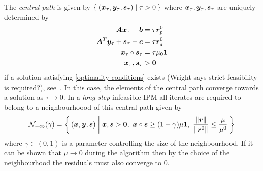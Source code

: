The \emph{central path} is given by \(\Set{(\bm{x}_\tau, \bm{y}_\tau, \bm{s}_\tau) | \tau > 0}\) where \(\bm{x}_\tau, \bm{y}_\tau, \bm{s}_\tau\) are uniquely determined by
\begin{subequations}
  \begin{align}
    \bm{A}\bm{x}_\tau - \bm{b} &= \tau \bm{r}_p^0 \\
    \bm{A}^T \bm{y}_\tau + \bm{s}_\tau - \bm{c} &= \tau \bm{r}_d^0 \\
    \bm{x}_\tau \circ \bm{s}_\tau &= \tau \mu_0 \bm{1} \\
    \bm{x}_\tau, \bm{s}_\tau &> \bm{0}
  \end{align}
\end{subequations}
if a solution satisfying \cref{optimality-conditions} exists (Wright says strict feasibility is required?), see~\cite{Mizuno-PolynomialTimeConvergenceInexactIPM}.
In this case, the elements of the central path converge towards a solution as \(\tau \to 0\).
In a \emph{long-step} infeasible IPM all iterates are required to belong to a neighbourhoood of this central path given by
\begin{equation}
  \mathcal{N}_{-\infty}(\gamma) = \Set{ (\vek{x}, \vek{y}, \vek{s}) | \vek{x}, \vek{s} > \vek{0}, \ \vek{x} \circ \vek{s} \geq (1 - \gamma) \mu \vek{1}, \ \frac{\norm{\vek{r}}}{\norm{\vek{r}^0}} \leq \frac{\mu}{\mu^0} }
\end{equation}
where \(\gamma \in (0, 1)\) is a parameter controlling the size of the neighbourhood.
If it can be shown that \(\mu \to 0\) during the algorithm then by the choice of the neighbourhood the residuals must also converge to \(0\).

